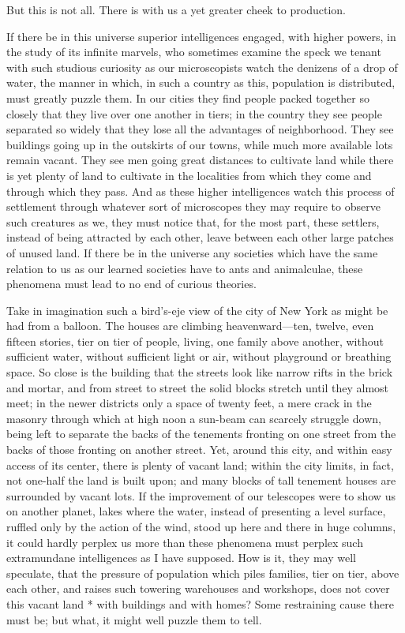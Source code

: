 \documentclass{book}
\begin{document}
But this is not all. There is with us a yet greater cheek to production.

If there be in this universe superior intelligences engaged, with higher powers, in the study of its infinite marvels, who sometimes examine the speck we tenant with such studious curiosity as our microscopists watch the denizens of a drop of water, the manner in which, in such a country as this, population is distributed, must greatly puzzle them. In our cities they find people packed together so closely that they live over one another in tiers; in the country they see people separated so widely that they lose all the advantages of neighborhood. They see buildings going up in the outskirts of our towns, while much more available lots remain vacant. They see men going great distances to cultivate land while there is yet plenty of land to cultivate in the localities from which they come and through which they pass. And as these higher intelligences watch this process of settlement through whatever sort of microscopes they may require to observe such creatures as we, they must notice that, for the most part, these settlers, instead of being attracted by each other, leave between each other large patches of unused land. If there be in the universe any societies which have the same relation to us as our learned societies have to ants and animalculae, these phenomena must lead to no end of curious theories.

Take in imagination such a bird’s-eje view of the city of New York as might be had from a balloon. The houses are climbing heavenward—ten, twelve, even fifteen stories, tier on tier of people, living, one family above another, without sufficient water, without sufficient light or air, without playground or breathing space. So close is the building that the streets look like narrow rifts in the brick and mortar, and from street to street the solid blocks stretch until they almost meet; in the newer districts only a space of twenty feet, a mere crack in the masonry through which at high noon a sun-beam can scarcely struggle down, being left to separate the backs of the tenements fronting on one street from the backs of those fronting on another street. Yet, around this city, and within easy access of its center, there is plenty of vacant land; within the city limits, in fact, not one-half the land is built upon; and many blocks of tall tenement houses are surrounded by vacant lots. If the improvement of our telescopes were to show us on another planet, lakes where the water, instead of presenting a level surface, ruffled only by the action of the wind, stood up here and there in huge columns, it could hardly perplex us more than these phenomena must perplex such extramundane intelligences as I have supposed. How is it, they may well speculate, that the pressure of population which piles families, tier on tier, above each other, and raises such towering warehouses and workshops, does not cover this vacant land * with buildings and with homes? Some restraining cause there must be; but what, it might well puzzle them to tell.
\end{document}
